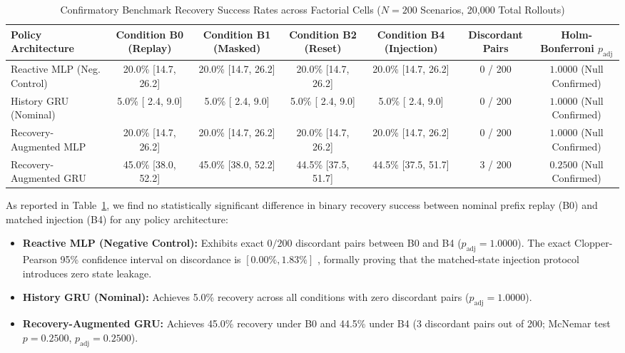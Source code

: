 \documentclass[letterpaper, 10 pt, conference]{ieeeconf}
\begin{document}
\begin{table}[t]
\caption{Confirmatory Benchmark Recovery Success Rates across Factorial Cells ($N=200$ Scenarios, 20,000 Total Rollouts)}
\label{tab:primary_recovery}
\centering
\begin{tabular}{lcccccc}
\toprule
\textbf{Policy Architecture} & \textbf{Condition B0 (Replay)} & \textbf{Condition B1 (Masked)} & \textbf{Condition B2 (Reset)} & \textbf{Condition B4 (Injection)} & \textbf{Discordant Pairs} & \textbf{Holm-Bonferroni $p_{\text{adj}}$} \\
\midrule
Reactive MLP (Neg. Control)   & 20.0\% [14.7, 26.2] & 20.0\% [14.7, 26.2] & 20.0\% [14.7, 26.2] & 20.0\% [14.7, 26.2] & 0 / 200 & $1.0000$ (Null Confirmed) \\
History GRU (Nominal)         &  5.0\% [ 2.4,  9.0] &  5.0\% [ 2.4,  9.0] &  5.0\% [ 2.4,  9.0] &  5.0\% [ 2.4,  9.0] & 0 / 200 & $1.0000$ (Null Confirmed) \\
Recovery-Augmented MLP        & 20.0\% [14.7, 26.2] & 20.0\% [14.7, 26.2] & 20.0\% [14.7, 26.2] & 20.0\% [14.7, 26.2] & 0 / 200 & $1.0000$ (Null Confirmed) \\
Recovery-Augmented GRU        & 45.0\% [38.0, 52.2] & 45.0\% [38.0, 52.2] & 44.5\% [37.5, 51.7] & 44.5\% [37.5, 51.7] & 3 / 200 & $0.2500$ (Null Confirmed) \\
\bottomrule
\end{tabular}
\end{table}

As reported in Table~\ref{tab:primary_recovery}, we find no statistically significant difference in binary recovery success between nominal prefix replay (B0) and matched injection (B4) for any policy architecture:
\begin{itemize}
    \item \textbf{Reactive MLP (Negative Control):} Exhibits exact $0/200$ discordant pairs between B0 and B4 ($p_{\text{adj}} = 1.0000$). The exact Clopper-Pearson 95\% confidence interval on discordance is $[0.00\%, 1.83\%]$ \cite{clopper1934use}, formally proving that the matched-state injection protocol introduces zero state leakage.
    \item \textbf{History GRU (Nominal):} Achieves 5.0\% recovery across all conditions with zero discordant pairs ($p_{\text{adj}} = 1.0000$).
    \item \textbf{Recovery-Augmented GRU:} Achieves 45.0\% recovery under B0 and 44.5\% under B4 (3 discordant pairs out of 200; McNemar test $p = 0.2500$, $p_{\text{adj}} = 0.2500$).
\end{itemize}
\end{document}
